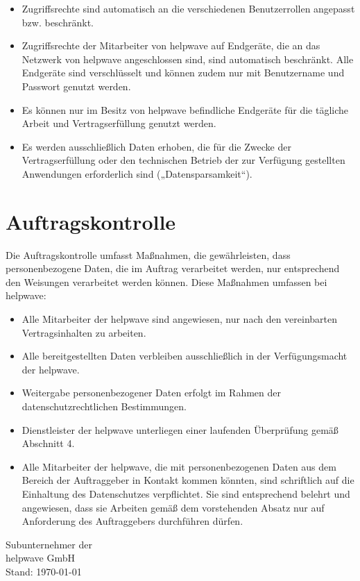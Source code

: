 \documentclass[10pt]{article}
\begin{document}
\begin{itemize}
	\item Zugriffsrechte sind automatisch an die verschiedenen Benutzerrollen angepasst bzw.
	      beschränkt.
	\item Zugriffsrechte der Mitarbeiter von helpwave auf Endgeräte, die an das Netzwerk von
	      helpwave angeschlossen sind, sind automatisch beschränkt. Alle Endgeräte sind
	      verschlüsselt und können zudem nur mit Benutzername und Passwort genutzt
	      werden.
	\item Es können nur im Besitz von helpwave befindliche Endgeräte für die tägliche Arbeit
	      und Vertragserfüllung genutzt werden.
	\item Es werden ausschließlich Daten erhoben, die für die Zwecke der Vertragserfüllung
	      oder den technischen Betrieb der zur Verfügung gestellten Anwendungen
	      erforderlich sind („Datensparsamkeit“).
\end{itemize}
\section{Auftragskontrolle}
Die Auftragskontrolle umfasst Maßnahmen, die gewährleisten, dass personenbezogene
Daten, die im Auftrag verarbeitet werden, nur entsprechend den Weisungen verarbeitet
werden können. Diese Maßnahmen umfassen bei helpwave:
\begin{itemize}
	\item Alle Mitarbeiter der helpwave sind angewiesen, nur nach den vereinbarten
	      Vertragsinhalten zu arbeiten.
	\item Alle bereitgestellten Daten verbleiben ausschließlich in der Verfügungsmacht der
	      helpwave.
	\item Weitergabe personenbezogener Daten erfolgt im Rahmen der
	      datenschutzrechtlichen Bestimmungen.
	\item Dienstleister der helpwave unterliegen einer laufenden Überprüfung gemäß
	      Abschnitt 4.
	\item Alle Mitarbeiter der helpwave, die mit personenbezogenen Daten aus dem Bereich
	      der Auftraggeber in Kontakt kommen könnten, sind schriftlich auf die Einhaltung des
	      Datenschutzes verpflichtet. Sie sind entsprechend belehrt und angewiesen, dass sie
	      Arbeiten gemäß dem vorstehenden Absatz nur auf Anforderung des Auftraggebers
	      durchführen dürfen.
\end{itemize}

\newpage

\begin{center}
	\Huge Subunternehmer der \\
	helpwave GmbH \\
	\vspace{1em}
	\Large Stand: \today
\end{center}
\end{document}
